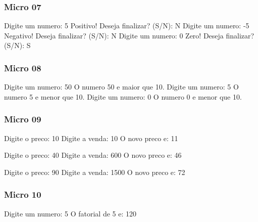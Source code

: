 \documentclass[12pt,a4paper,twoside]{report}
\begin{document}
\subsubsection{Micro 07}


\begin{terminal}
Digite um numero: 5
Positivo!
Deseja finalizar? (S/N): N
Digite um numero: -5
Negativo!
Deseja finalizar? (S/N): N
Digite um numero: 0
Zero!
Deseja finalizar? (S/N): S
\end{terminal}

\subsubsection{Micro 08}


\begin{terminal}
Digite um numero: 50
O numero 50 e maior que 10.
Digite um numero: 5
O numero 5 e menor que 10.
Digite um numero: 0
O numero 0 e menor que 10.
\end{terminal}

\subsubsection{Micro 09}


\begin{terminal}
Digite o preco: 10
Digite a venda: 10
O novo preco e: 11

Digite o preco: 40
Digite a venda: 600
O novo preco e: 46

Digite o preco: 90
Digite a venda: 1500
O novo preco e: 72
\end{terminal}

\subsubsection{Micro 10}


\begin{terminal}
Digite um numero: 5
O fatorial de 5 e: 120
\end{terminal}
\end{document}
